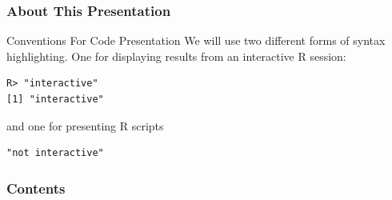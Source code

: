 


\begin{frame}[fragile]
\frametitle{About This Presentation}
 \begin{block}{Conventions For Code Presentation}
We will use two different forms of syntax highlighting.  One for displaying results from an interactive R session:
\begin{lstlisting}[backgroundcolor=\color{white},basicstyle=\ttfamily\color{dkgray}\scriptsize,keywordstyle=\color{black}, 
  commentstyle=\color{orange},stringstyle=\color{mauve}]
R> "interactive"
[1] "interactive"
\end{lstlisting}
and one for presenting R scripts
\begin{lstlisting}
"not interactive"
\end{lstlisting}
 \end{block}
\end{frame}



\begin{frame}
\frametitle{Contents}
\small
\tableofcontents[hideallsubsections]
\end{frame}

\setcounter{framenumber}{0}
